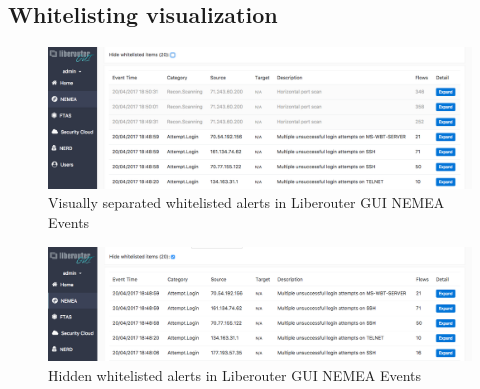 \documentclass[11pt,a4paper]{article}
\begin{document}
\subsection{Whitelisting visualization}
\begin{figure}[h]
    \includegraphics[width=\linewidth]{before.png}
    \centering
	\caption{Visually separated whitelisted alerts in Liberouter GUI NEMEA Events}
    \label{before}
\end{figure}
\begin{figure}[h]
    \includegraphics[width=\linewidth]{after.png}
    \centering
	\caption{Hidden whitelisted alerts in Liberouter GUI NEMEA Events}
	\label{after}
\end{figure}
\end{document}
